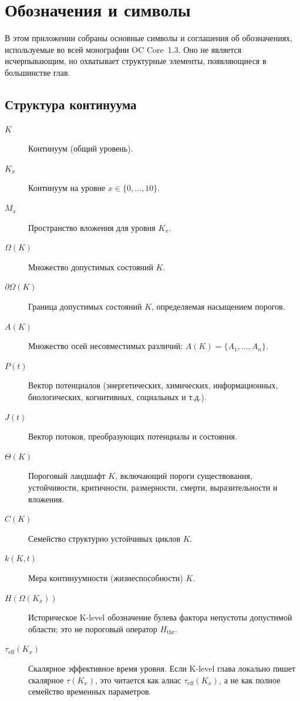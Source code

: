 \section{Обозначения и символы}
\label{app:notation}

В этом приложении собраны основные символы и соглашения об обозначениях, используемые
во всей монографии OC Core~1.3. Оно не является исчерпывающим, но охватывает
структурные элементы, появляющиеся в большинстве глав.

\subsection{Структура континуума}

\begin{description}
  \item[\(K\)] Континуум (общий уровень).
  \item[\(K_x\)] Континуум на уровне \(x\in\{0,\dots,10\}\).
  \item[\(M_x\)] Пространство вложения для уровня \(K_x\).
  \item[\(\Omega(K)\)] Множество допустимых состояний \(K\).
  \item[\(\partial\Omega(K)\)] Граница допустимых состояний \(K\), определяемая
        насыщением порогов.
  \item[\(A(K)\)] Множество осей несовместимых различий:
        \(A(K) = \{A_1,\dots,A_n\}\).
  \item[\(P(t)\)] Вектор потенциалов (энергетических, химических, информационных,
        биологических, когнитивных, социальных и т.д.).
  \item[\(J(t)\)] Вектор потоков, преобразующих потенциалы и состояния.
  \item[\(\Theta(K)\)] Пороговый ландшафт \(K\), включающий пороги существования,
        устойчивости, критичности, размерности, смерти, выразительности и
        вложения.
  \item[\(C(K)\)] Семейство структурно устойчивых циклов \(K\).
  \item[\(k(K,t)\)] Мера континуумности (жизнеспособности) \(K\).
  \item[\(H(\Omega(K_x))\)] Историческое K-level обозначение булева фактора
        непустоты допустимой области; это не пороговый оператор
        \(H_{\mathrm{thr}}\).
  \item[\(\tau_{\mathrm{eff}}(K_x)\)] Скалярное эффективное время уровня.
        Если K-level глава локально пишет скалярное \(\tau(K_x)\), это
        читается как алиас \(\tau_{\mathrm{eff}}(K_x)\), а не как полное
        семейство временных параметров.
\end{description}

